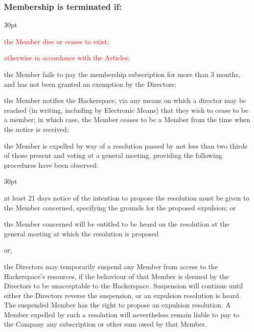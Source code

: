\documentclass[12pt]{article}
\def\clauseindent{30pt}
\newenvironment{subindentpara}{\begin{adjustwidth}{\clauseindent}{}\begin{hanginglist}}{\end{hanginglist}\end{adjustwidth}}
\begin{document}
\subsubsection[Specifics of termination of membership]{Membership is terminated if:}
\begin{subindentpara}
    \item \textcolor{red}{the Member dies or ceases to exist;}
    \item \textcolor{red}{otherwise in accordance with the Articles;}
    \item the Member fails to pay the membership subscription for more than 3 months, and has not been granted an exemption by the Directors;
    \item the Member notifies the Hackerspace, via any means on which a director may be reached (in writing, including by Electronic Means) that they wish to cease to be a member; in which case, the Member ceases to be a Member from the time when the notice is received;
    \item the Member is expelled by way of a resolution passed by not less than two thirds of those present and voting at a general meeting, providing the following procedures have been observed: 
    \begin{subindentpara} %
        \item at least 21 days notice of the intention to propose the resolution must be given to the Member concerned,  specifying the grounds for the proposed expulsion; or
        \item the Member concerned will be entitled to be heard on the resolution at the general meeting at which the resolution is proposed
    \end{subindentpara}
    \item or;
    \item the Directors may temporarily suspend any Member from access to the Hackerspace's resources, if the behaviour of that Member is deemed by the Directors to be unacceptable to the Hackerspace. Suspension will continue until either the Directors reverse the suspension, or an expulsion resolution is heard. The suspended Member has the right to propose an expulsion resolution. A Member expelled by such a resolution will nevertheless remain liable to pay to the Company any subscription or other sum owed by that Member.
\end{subindentpara}
\end{document}
